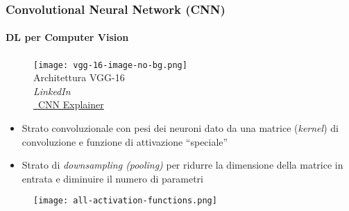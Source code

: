 \begin{frame}[t] \frametitle{Convolutional Neural Network (CNN)}
\framesubtitle{DL per Computer Vision}
{\scriptsize
	\vspace*{-.5cm}
	\begin{minipage}[t]{\textwidth}
		\begin{figure}[ht]
			\centering
			\texttt{[image: vgg-16-image-no-bg.png]}
			{\tiny\\Architettura VGG-16\\\textit{\textcopyright LinkedIn}\\\href{https://poloclub.github.io/cnn-explainer/}{\faExternalLinkSquare\ CNN Explainer}}
		\end{figure}
	\end{minipage}
	\vfill
	\begin{minipage}[t]{\textwidth}
		\begin{itemize}[leftmargin=10pt,align=right]
				\onslide<2->\item[\alert{\faArrowCircleRight}] \alert{Strato convoluzionale} con pesi dei neuroni dato da una matrice (\emph{kernel}) di convoluzione e funzione di attivazione ``speciale''
				\onslide<3->\item[\alert{\faArrowCircleRight}] \alert{Strato di \emph{downsampling (pooling)}} per ridurre la dimensione della matrice in entrata e diminuire il numero di parametri
			\end{itemize}
	\end{minipage}
	\begin{minipage}[t]{\textwidth}
		\vspace*{.3cm}
		\begin{figure}[ht]
			\centering
			\texttt{[image: all-activation-functions.png]}
		\end{figure}
	\end{minipage}
}
\end{frame}